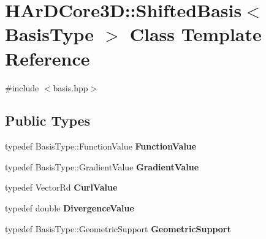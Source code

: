 \hypertarget{classHArDCore3D_1_1ShiftedBasis}{}\section{H\+Ar\+D\+Core3D\+:\+:Shifted\+Basis$<$ Basis\+Type $>$ Class Template Reference}
\label{classHArDCore3D_1_1ShiftedBasis}


{\ttfamily \#include $<$basis.\+hpp$>$}

\subsection*{Public Types}
\begin{DoxyCompactItemize}
\item 
\mbox{\label{classHArDCore3D_1_1ShiftedBasis_adfb11a56f0804ecdf268b8523abd450b}} 
typedef Basis\+Type\+::\+Function\+Value {\bfseries Function\+Value}
\item 
\mbox{\label{classHArDCore3D_1_1ShiftedBasis_acf31c5df5dc17e5b93a921eaa68731ef}} 
typedef Basis\+Type\+::\+Gradient\+Value {\bfseries Gradient\+Value}
\item 
\mbox{\label{classHArDCore3D_1_1ShiftedBasis_aa211a7a7092eadf348a9f8fc52c8ac7b}} 
typedef Vector\+Rd {\bfseries Curl\+Value}
\item 
\mbox{\label{classHArDCore3D_1_1ShiftedBasis_addf96b150b94a4fe6db4d69d0c73c405}} 
typedef double {\bfseries Divergence\+Value}
\item 
\mbox{\label{classHArDCore3D_1_1ShiftedBasis_a67fe9edf4dbbff050f7965b55f1b974b}} 
typedef Basis\+Type\+::\+Geometric\+Support {\bfseries Geometric\+Support}
\end{DoxyCompactItemize}
